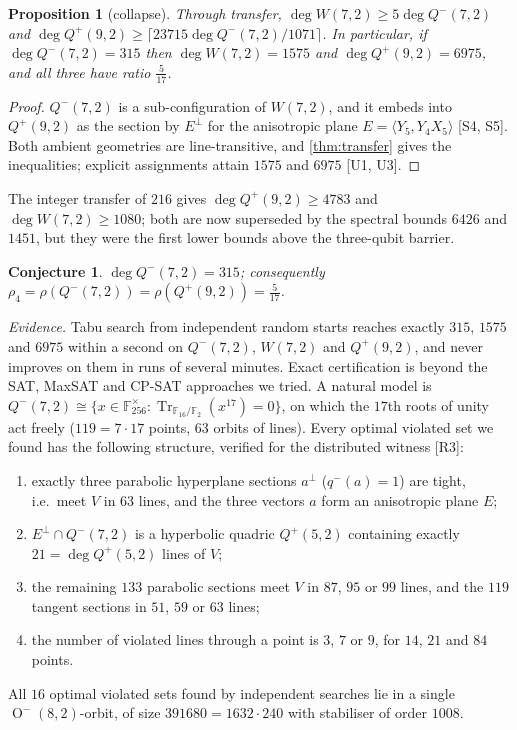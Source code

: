 \documentclass[a4paper,onecolumn,11pt,unpublished,nopdfoutputerror]{quantumarticle}
\newtheorem{proposition}[theorem]{Proposition}
\newtheorem{conjecture}[theorem]{Conjecture}
\theoremstyle{definition}
\newcommand{\cert}[1]{\textcolor{certblue}{\textsf{[#1]}}}
\newcommand{\F}{\mathbb{F}_2}
\renewcommand{\deg}{\operatorname{deg}}
\newcommand{\Orth}{\operatorname{O}}
\newcommand{\W}[1]{W(#1,2)}
\newcommand{\Qp}[1]{Q^{+}(#1,2)}
\newcommand{\Qm}[1]{Q^{-}(#1,2)}
\begin{document}
\begin{proposition}[collapse]\label{prop:collapse}
Through transfer, $\deg\W7\ge5\deg\Qm7$ and $\deg\Qp9\ge\lceil23715\deg\Qm7/1071\rceil$. In particular, if
$\deg\Qm7=315$ then $\deg\W7=1575$ and $\deg\Qp9=6975$, and all three have ratio $\tfrac5{17}$.
\end{proposition}
\begin{proof}
$\Qm7$ is a sub-configuration of $\W7$, and it embeds into $\Qp9$ as the section by $E^\perp$ for the anisotropic
plane $E=\langle Y_5,Y_4X_5\rangle$ \cert{S4, S5}. Both ambient geometries are line-transitive, and
\cref{thm:transfer} gives the inequalities; explicit assignments attain $1575$ and $6975$ \cert{U1, U3}.
\end{proof}

The integer transfer of $216$ gives $\deg\Qp9\ge4783$ and $\deg\W7\ge1080$; both are now superseded by the
spectral bounds $6426$ and $1451$, but they were the first lower bounds above the three-qubit barrier.

\begin{conjecture}\label{conj:517}
$\deg\Qm7=315$; consequently $\rho_4=\rho(\Qm7)=\rho(\Qp9)=\tfrac5{17}$.
\end{conjecture}

\emph{Evidence.} Tabu search from independent random starts reaches exactly $315$, $1575$ and $6975$ within a second
on $\Qm7$, $\W7$ and $\Qp9$, and never improves on them in runs of several minutes. Exact certification is beyond the
SAT, MaxSAT and CP-SAT approaches we tried. A natural model is
$\Qm7\cong\{x\in\mathbb F_{256}^\times:\operatorname{Tr}_{\mathbb F_{16}/\F}(x^{17})=0\}$, on which the $17$th roots of unity
act freely ($119=7\cdot17$ points, $63$ orbits of lines). Every optimal violated set we found has the following
structure, verified for the distributed witness \cert{R3}:
\begin{enumerate}[label=(\roman*)]
\item exactly three parabolic hyperplane sections $a^\perp$ ($q^-(a)=1$) are tight, i.e.\ meet $V$ in $63$ lines,
and the three vectors $a$ form an anisotropic plane $E$;
\item $E^\perp\cap\Qm7$ is a hyperbolic quadric $\Qp5$ containing exactly $21=\deg\Qp5$ lines of $V$;
\item the remaining $133$ parabolic sections meet $V$ in $87$, $95$ or $99$ lines, and the $119$ tangent sections in
$51$, $59$ or $63$ lines;
\item the number of violated lines through a point is $3$, $7$ or $9$, for $14$, $21$ and $84$ points.
\end{enumerate}
All $16$ optimal violated sets found by independent searches lie in a single $\Orth^-(8,2)$-orbit, of size
$391680=1632\cdot240$ with stabiliser of order $1008$.
\end{document}
